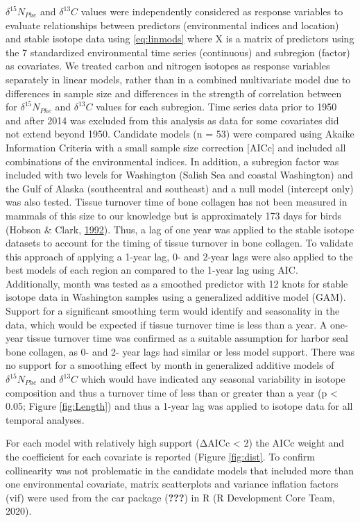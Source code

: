 \documentclass [11pt, proquest] {uwthesis}[2015/03/03]
\begin{document}
\(\delta^{15}N_{Phe}\) and \(\delta^{13}C\) values were independently
considered as response variables to evaluate relationships between
predictors (environmental indices and location) and stable isotope data
using \eqref{eq:linmods} where X is a matrix of predictors using the 7
standardized environmental time series (continuous) and subregion
(factor) as covariates. We treated carbon and nitrogen isotopes as
response variables separately in linear models, rather than in a
combined multivariate model due to differences in sample size and
differences in the strength of correlation between for
\(\delta^{15}N_{Phe}\) and \(\delta^{13}C\) values for each subregion.
Time series data prior to 1950 and after 2014 was excluded from this
analysis as data for some covariates did not extend beyond 1950.
Candidate models (n = 53) were compared using Akaike Information
Criteria with a small sample size correction {[}AICc{]} and included all
combinations of the environmental indices. In addition, a subregion
factor was included with two levels for Washington (Salish Sea and
coastal Washington) and the Gulf of Alaska (southcentral and southeast)
and a null model (intercept only) was also tested. Tissue turnover time
of bone collagen has not been measured in mammals of this size to our
knowledge but is approximately 173 days for birds (Hobson \& Clark,
\protect\hyperlink{ref-Hobson1992}{1992}). Thus, a lag of one year was
applied to the stable isotope datasets to account for the timing of
tissue turnover in bone collagen. To validate this approach of applying
a 1-year lag, 0- and 2-year lags were also applied to the best models of
each region an compared to the 1-year lag using AIC. Additionally, month
was tested as a smoothed predictor with 12 knots for stable isotope data
in Washington samples using a generalized additive model (GAM). Support
for a significant smoothing term would identify and seasonality in the
data, which would be expected if tissue turnover time is less than a
year. A one-year tissue turnover time was confirmed as a suitable
assumption for harbor seal bone collagen, as 0- and 2- year lags had
similar or less model support. There was no support for a smoothing
effect by month in generalized additive models of \(\delta^{15}N_{Phe}\)
and \(\delta^{13}C\) which would have indicated any seasonal variability
in isotope composition and thus a turnover time of less than or greater
than a year (p \textless{} 0.05; Figure \ref{fig:Length}) and thus a
1-year lag was applied to isotope data for all temporal analyses.

For each model with relatively high support (ΔAICc \textless{} 2) the
AICc weight and the coefficient for each covariate is reported (Figure
\ref{fig:dist}. To confirm collinearity was not problematic in the
candidate models that included more than one environmental covariate,
matrix scatterplots and variance inflation factors (vif) were used from
the car package ({\textbf{???}}) in R (R Development Core Team, 2020).
\end{document}
